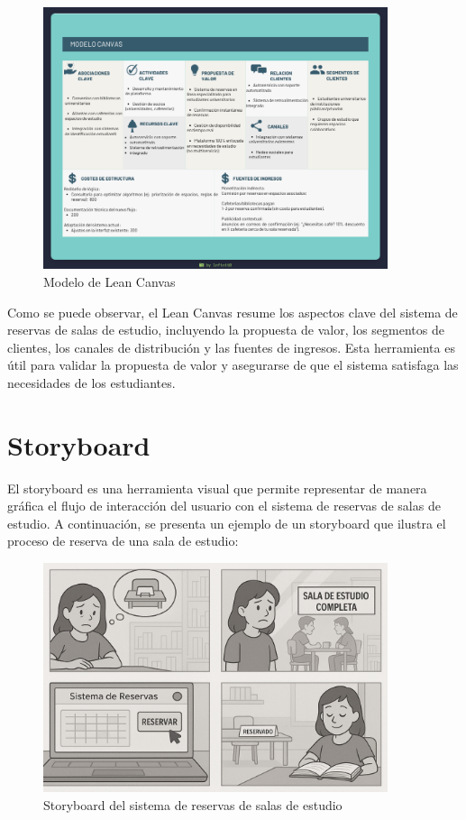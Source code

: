 \documentclass{article}
\begin{document}
      \begin{figure}[ht]
        \centering
        \includegraphics[width=0.9\textwidth]{assets/lean.png}
        \caption{Modelo de Lean Canvas}
        \label{fig:example-image}
      \end{figure}

      Como se puede observar, el Lean Canvas resume los aspectos clave del sistema de reservas de salas de estudio, incluyendo la propuesta de valor, los segmentos de clientes, los canales de distribución y las fuentes de ingresos. Esta herramienta es útil para validar la propuesta de valor y asegurarse de que el sistema satisfaga las necesidades de los estudiantes.


      \newpage

      \section{Storyboard}

      El storyboard es una herramienta visual que permite representar de manera gráfica el flujo de interacción del usuario con el sistema de reservas de salas de estudio. A continuación, se presenta un ejemplo de un storyboard que ilustra el proceso de reserva de una sala de estudio:

      \begin{figure}[ht]
        \centering
        \includegraphics[width=0.9\textwidth]{assets/storyboard.png}
        \caption{Storyboard del sistema de reservas de salas
        de estudio}
        \label{fig:Storyboard}
      \end{figure}
  
\end{document}
